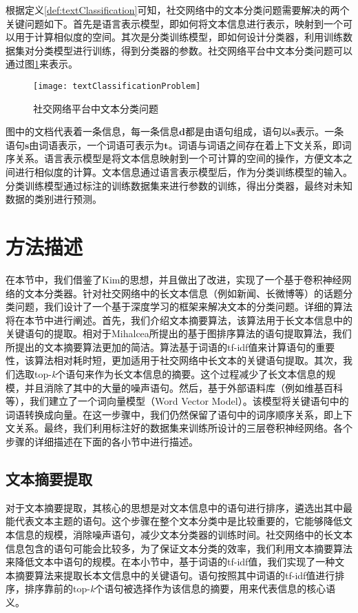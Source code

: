 根据定义\ref{def:textClassification}可知，社交网络中的文本分类问题需要解决的两个关键问题如下。首先是语言表示模型，即如何将文本信息进行表示，映射到一个可以用于计算相似度的空间。其次是分类训练模型，即如何设计分类器，利用训练数据集对分类模型进行训练，得到分类器的参数。社交网络平台中文本分类问题可以通过图\ref{fig:textClassificationProblem}来表示。

\begin{figure}[!htbp] %
  \centering
  \texttt{[image: textClassificationProblem]}
  \caption{社交网络平台中文本分类问题}
  \label{fig:textClassificationProblem}
\end{figure}

图中的文档代表着一条信息，每一条信息$\mathbf{d}$都是由语句组成，语句以$\mathbf{s}$表示。一条语句$\mathbf{s}$由词语表示，一个词语可表示为$\mathbf{t}$。词语与词语之间存在着上下文关系，即词序关系。语言表示模型是将文本信息映射到一个可计算的空间的操作，方便文本之间进行相似度的计算。文本信息通过语言表示模型后，作为分类训练模型的输入。分类训练模型通过标注的训练数据集来进行参数的训练，得出分类器，最终对未知数据的类别进行预测。

\section{方法描述}
\label{sec3:method}
在本节中，我们借鉴了Kim的思想，并且做出了改进，实现了一个基于卷积神经网络的文本分类器。针对社交网络中的长文本信息（例如新闻、长微博等）的话题分类问题，我们设计了一个基于深度学习的框架来解决文本的分类问题。详细的算法将在本节中进行阐述。首先，我们介绍文本摘要算法，该算法用于长文本信息中的关键语句的提取。相对于Mihalcea所提出的基于图排序算法的语句提取算法，我们所提出的文本摘要算法更加的简洁。算法基于词语的tf-idf值来计算语句的重要性，该算法相对耗时短，更加适用于社交网络中长文本的关键语句提取。其次，我们选取top-\textit{k}个语句来作为长文本信息的摘要。这个过程减少了长文本信息的规模，并且消除了其中的大量的噪声语句。然后，基于外部语料库（例如维基百科等），我们建立了一个词向量模型（Word Vector Model）。该模型将关键语句中的词语转换成向量。在这一步骤中，我们仍然保留了语句中的词序顺序关系，即上下文关系。最终，我们利用标注好的数据集来训练所设计的三层卷积神经网络。各个步骤的详细描述在下面的各小节中进行描述。

\subsection{文本摘要提取}
\label{subsec3:abstactExtract}
对于文本摘要提取，其核心的思想是对文本信息中的语句进行排序，遴选出其中最能代表文本主题的语句。这个步骤在整个文本分类中是比较重要的，它能够降低文本信息的规模，消除噪声语句，减少文本分类器的训练时间。社交网络中的长文本信息包含的语句可能会比较多，为了保证文本分类的效率，我们利用文本摘要算法来降低文本中语句的规模。在本小节中，基于词语的tf-idf值，我们实现了一种文本摘要算法来提取长本文信息中的关键语句。语句按照其中词语的tf-idf值进行排序，排序靠前的top-\textit{k}个语句被选择作为该信息的摘要，用来代表信息的核心语义。

